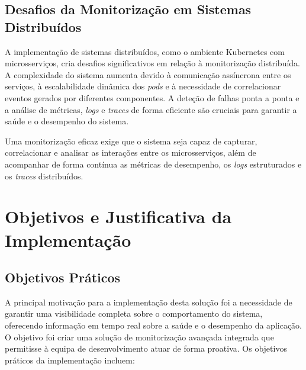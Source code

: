 \subsection{Desafios da Monitorização em Sistemas Distribuídos}

A implementação de sistemas distribuídos, como o ambiente Kubernetes com microsserviços, cria desafios significativos em relação à monitorização distribuída. A complexidade do sistema aumenta devido à comunicação assíncrona entre os serviços, à escalabilidade dinâmica dos \textit{pods} e à necessidade de correlacionar eventos gerados por diferentes componentes. A deteção de falhas ponta a ponta e a análise de métricas, \textit{logs} e \textit{traces} de forma eficiente são cruciais para garantir a saúde e o desempenho do sistema. 

Uma monitorização eficaz exige que o sistema seja capaz de capturar, correlacionar e analisar as interações entre os microsserviços, além de acompanhar de forma contínua as métricas de desempenho, os \textit{logs} estruturados e os \textit{traces} distribuídos.


\section{Objetivos e Justificativa da Implementação}

\subsection{Objetivos Práticos}

A principal motivação para a implementação desta solução foi a necessidade de garantir uma visibilidade completa sobre o comportamento do sistema, oferecendo informação em tempo real sobre a saúde e o desempenho da aplicação. O objetivo foi criar uma solução de monitorização avançada integrada que permitisse à equipa de desenvolvimento atuar de forma proativa. Os objetivos práticos da implementação incluem:


